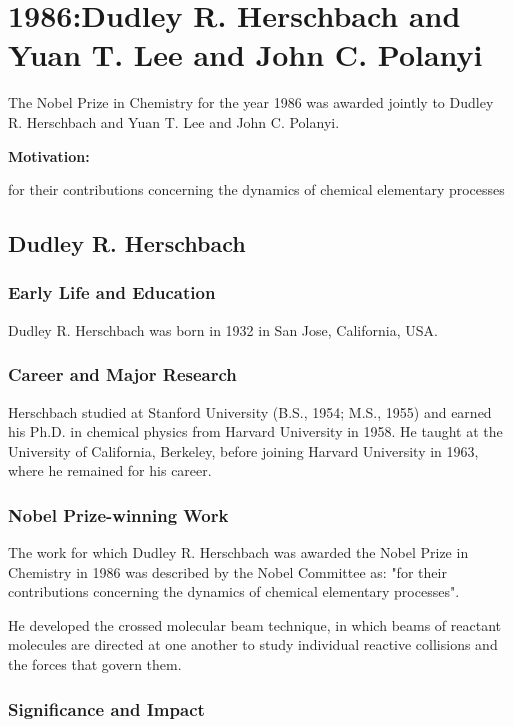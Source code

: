 \chapter{1986:Dudley R. Herschbach and Yuan T. Lee and John C. Polanyi}

\label{chap:chemistry1986}

The Nobel Prize in Chemistry for the year 1986 was awarded jointly to Dudley R. Herschbach and Yuan T. Lee and John C. Polanyi.

\textbf{Motivation:}

for their contributions concerning the dynamics of chemical elementary processes

\section{Dudley R. Herschbach}

\subsection*{Early Life and Education}

Dudley R. Herschbach was born in 1932 in San Jose, California, USA.

\subsection*{Career and Major Research}

Herschbach studied at Stanford University (B.S., 1954; M.S., 1955) and earned his Ph.D. in chemical physics from Harvard University in 1958. He taught at the University of California, Berkeley, before joining Harvard University in 1963, where he remained for his career.

\subsection*{Nobel Prize-winning Work}

The work for which Dudley R. Herschbach was awarded the Nobel Prize in Chemistry in 1986 was described by the Nobel Committee as: "for their contributions concerning the dynamics of chemical elementary processes".

He developed the crossed molecular beam technique, in which beams of reactant molecules are directed at one another to study individual reactive collisions and the forces that govern them.

\subsection*{Significance and Impact}

